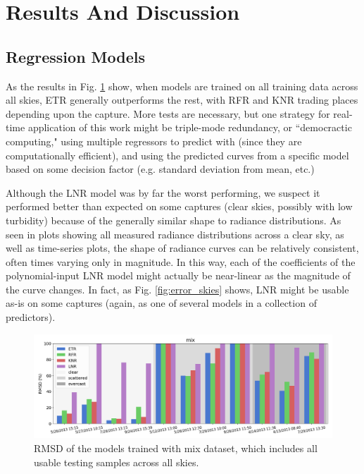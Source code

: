 \section{Results And Discussion}
\label{sec:results}

\subsection{Regression Models}
\label{result_models}

As the results in Fig. \ref{fig:error_mix} show, when models are trained on all training data across all skies, ETR generally outperforms the rest, with RFR and KNR trading places depending upon the capture. More tests are necessary, but one strategy for real-time application of this work might be triple-mode redundancy,\cite{anderson_tmr} or ``democractic computing," using multiple regressors to predict with (since they are computationally efficient), and using the predicted curves from a specific model based on some decision factor (e.g. standard deviation from mean, etc.)

Although the LNR model was by far the worst performing, we suspect it performed better than expected on some captures (clear skies, possibly with low turbidity) because of the generally similar shape to radiance distributions. As seen in plots showing all measured radiance distributions across a clear sky, as well as time-series plots, the shape of radiance curves can be relatively consistent, often times varying only in magnitude. In this way, each of the coefficients of the polynomial-input LNR model might actually be near-linear as the magnitude of the curve changes. In fact, as Fig. \ref{fig:error_skies} shows, LNR might be usable as-is on some captures (again, as one of several models in a collection of predictors).

\begin{figure} [hbtp]
\begin{center}
\includegraphics[width=1.0\textwidth]{img/results_mix.png}
\end{center}
\caption[error_mix] { \label{fig:error_mix}RMSD of the models trained with mix dataset, which includes all usable testing samples across all skies.}
\end{figure}


